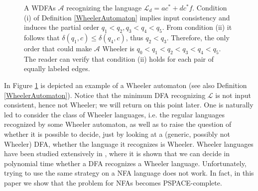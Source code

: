 \documentclass[runningheads]{llncs}
\begin{document}
\begin{figure}[ht]%
\begin{center}
\end{center}
    \caption{A WDFAs $\mathcal A$ recognizing the language $\mathcal L_d = ac^*+dc^*f$. Condition (i) of Definition \ref{WheelerAutomaton} implies input consistency and induces the partial order $q_1 < q_2, q_3 < q_4 < q_5$. From condition (ii) it follows that $\delta(q_1, c) \le \delta(q_4, c)$, thus $q_2 < q_3$. Therefore, the only order that could make $\mathcal A$ Wheeler is $q_0 < q_1 < q_2 < q_3 < q_4 < q_5$. The reader can verify that condition (ii) holds for each pair of equally labeled edges.}%
    \label{w}%
\end{figure}

In Figure \ref{w} is depicted an example of a Wheeler automaton (see also Definition \ref{WheelerAutomaton}). Notice that the minimum DFA recognizing $\mathcal L$ is not input consistent, hence not Wheeler; we will return on this point later. 
One is naturally led to consider the class of Wheeler languages, i.e. the regular languages recognized by some Wheeler automaton, as well as to raise the question of whether it is possible to decide, just by looking at a (generic, possibly not Wheeler) DFA, whether the language it recognizes is Wheeler. Wheeler languages have been studied extensively in \cite{ADPP2}, where it is shown that we can decide in polynomial time whether a DFA recognizes a Wheeler language. 
Unfortunately, trying to use the same strategy on a NFA language does not work. In fact, in this paper we  show that  the problem for NFAs becomes PSPACE-complete.
  
\end{document}

